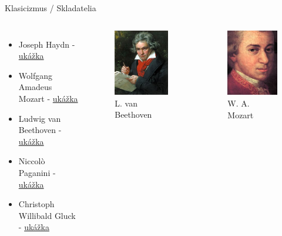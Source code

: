 \documentclass[dvipsnames]{beamer}
\begin{document}
\begin{frame}{\small Klasicizmus / \Large Skladatelia}
	\begin{columns}

	\begin{itemize}
		\item Joseph Haydn - \href{https://www.gtsforum.xyz/haydn.mp3}{ukážka}
		\item Wolfgang Amadeus Mozart - \href{https://www.gtsforum.xyz/mozart.mp3}{ukážka}
		\item Ludwig van Beethoven - \href{https://www.gtsforum.xyz/beethoven.mp3}{ukážka}
		\item Niccolò Paganini - \href{https://www.gtsforum.xyz/paganini.ogg}{ukážka}
		\item Christoph  Willibald Gluck - \href{https://www.gtsforum.xyz/gluck.ogg}{ukážka}
	\end{itemize}
		\begin{figure}
			\includegraphics[scale=0.45]{beethoven}
			\caption{L. van Beethoven}
		\end{figure}
		\begin{figure}
			\includegraphics[scale=0.45]{mozart}
			\caption{W. A. Mozart}
		\end{figure}

	\end{columns}
\end{frame}
\end{document}
